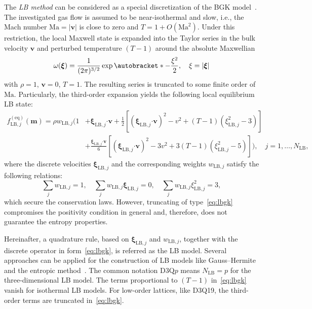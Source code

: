 \documentclass{elsarticle} %
\newcommand{\Ma}{\mathrm{Ma}}
\newcommand{\OO}[1]{O(#1)}
\DeclarePairedDelimiter\autobracket()       %
\newcommand{\br}[1]{\autobracket*{#1}}
\newcommand{\bxi}{\boldsymbol{\xi}}
\newcommand{\bv}{\boldsymbol{v}}
\newcommand{\bm}{\boldsymbol{m}}
\newcommand{\bdot}{\boldsymbol{\cdot}}
\newcommand{\equil}[1]{#1^\mathrm{(eq)}}
\newcommand{\LB}{\mathrm{LB}}
\begin{document}
The \emph{LB method} can be considered as a special discretization of the BGK model~\cite{Succi2001}.
The investigated gas flow is assumed to be near-isothermal and slow,
i.e., the Mach number \(\Ma = |\bv|\) is close to zero and \(T = 1 + \OO{\Ma^2}\).
Under this restriction, the local Maxwell state is expanded into the Taylor series
in the bulk velocity \(\bv\) and perturbed temperature \((T-1)\)
around the absolute Maxwellian
\begin{equation}\label{eq:omega}
    \omega(\bxi) = \frac{1}{(2\pi)^{3/2}}\exp\br{ -\frac{\xi^2}{2} }, \quad \xi = |\bxi|
\end{equation}
with \(\rho=1\), \(\bv=0\), \(T=1\).
The resulting series is truncated to some finite order of \(\Ma\).
Particularly, the third-order expansion yields the following local equilibrium LB state:
\begin{equation}\label{eq:lbgk}
    \begin{aligned}
    \equil{f}_{\LB,j}(\bm) = \rho w_{\LB,j}\bigg( 1
        &+ \bxi_{\LB,j}\bdot\bv
        + \frac12\left[ (\bxi_{\LB,j}\bdot\bv)^2 - v^2 + (T-1)(\xi_{\LB,j}^2 - 3) \right] \\
        &+ \frac{\bxi_{\LB,j}\bdot\bv}6\left[ (\bxi_{\LB,j}\bdot\bv)^2 - 3v^2 + 3(T-1)(\xi_{\LB,j}^2-5) \right]
    \bigg), \quad j = 1,\ldots,N_\LB,
    \end{aligned}
\end{equation}
where the discrete velocities \(\bxi_{\LB,j}\) and the corresponding weights \(w_{\LB,j}\) satisfy the following relations:
\begin{equation}
    \sum_j w_{\LB,j} = 1, \quad \sum_j w_{\LB,j} \bxi_{\LB,j} = 0, \quad \sum_j w_{\LB,j} \xi_{\LB,j}^2 = 3,
\end{equation}
which secure the conservation laws.
However, truncating of type~\eqref{eq:lbgk} compromises the positivity condition in general
and, therefore, does not guarantee the entropy properties.

Hereinafter, a quadrature rule, based on \(\bxi_{\LB,j}\) and \(w_{\LB,j}\),
together with the discrete operator in form~\eqref{eq:lbgk},
is referred as the LB model.
Several approaches can be applied for the construction of LB models
like Gauss--Hermite~\cite{He1997, Shan1998, Shan2006, Shan2010}
and the entropic method~\cite{Karlin1999, Chikatamarla2006, Chikatamarla2009}.
The common notation D3Q\(p\) means \(N_\LB=p\) for the three-dimensional LB model.
The terms proportional to \((T-1)\) in~\eqref{eq:lbgk} vanish for isothermal LB models.
For low-order lattices, like D3Q19, the third-order terms are truncated in~\eqref{eq:lbgk}.
\end{document}
